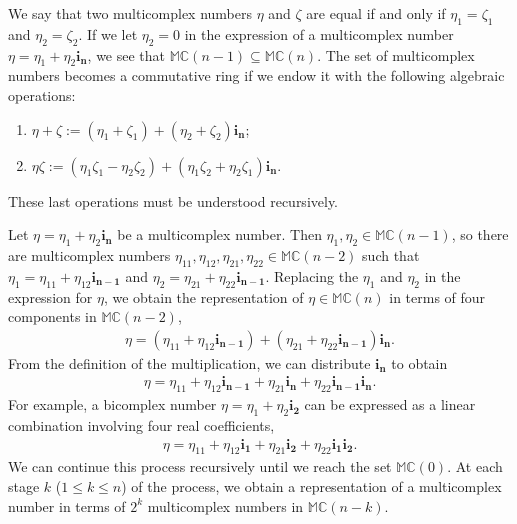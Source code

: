 \documentclass[12pt]{amsart}
\theoremstyle{plain}
\theoremstyle{definition}
\numberwithin{equation}{section}
\newcommand{\im}[1]{\mathbf{ i_{#1}}}
\newcommand{\mC}{\mathbb{C}}
\newcommand{\mM}{\mathbb{M}}
\begin{document}
We say that two multicomplex numbers $\eta$ and $\zeta$ are equal if and only if $\eta_1 = \zeta_1$ and $\eta_2 = \zeta_2$. If we let $\eta_2 = 0$ in the expression of a multicomplex number $\eta = \eta_1 + \eta_2 \im{n}$, we see that $\mM \mC(n - 1) \subseteq \mM \mC(n )$. The set of multicomplex numbers becomes a commutative ring if we endow it with the following algebraic operations:
    \begin{enumerate}[label=\arabic*)]
    \item $\eta + \zeta := (\eta_1 + \zeta_1 ) + (\eta_2 + \zeta_2) \im{n}$;
    \item $\eta \zeta := (\eta_1 \zeta_1 - \eta_2 \zeta_2) + (\eta_1 \zeta_2 + \eta_2 \zeta_1) \im{n}$.
    \end{enumerate}
    These last operations must be understood recursively.
    
    Let $\eta = \eta_1 + \eta_2 \im{n}$ be a multicomplex number. 
  Then $\eta_1 , \eta_2 \in \mM \mC(n - 1)$, so there are multicomplex numbers $\eta_{11}, \eta_{12}, \eta_{21}, \eta_{22}  \in \mM \mC(n - 2 )$ 
 such that $\eta_1 = \eta_{11} + \eta_{12} \im{n-1}$ and $\eta_2 = \eta_{21} + \eta_{22} \im{n-1}$. Replacing the $\eta_1$ and $\eta_2$ in the expression for $\eta$, we obtain the representation of $\eta\in\mM \mC(n)$ in terms of four components in $\mM \mC(n - 2)$,
        \begin{align*}
        \eta=(\eta_{11} + \eta_{12} \im{n - 1} ) + (\eta_{21} + \eta_{22} \im{n - 1}) \im{n}.
        \end{align*}
    From the definition of the multiplication, we can distribute $\im{n}$ to obtain
        \begin{align*}
        \eta=\eta_{11} + \eta_{12} \im{n-1} + \eta_{21} \im{n} + \eta_{22} \im{n-1} \im{n}.
        \end{align*}
    For example, a bicomplex number $\eta = \eta_1 + \eta_2 \im{2}$ can be expressed as a linear combination involving four real coefficients,
        \begin{align*}
        \eta = \eta_{11} + \eta_{12} \im{1} + \eta_{21} \im{2} + \eta_{22} \im{1}\im{2}.
        \end{align*}
    We can continue this process recursively until we reach the set $\mM \mC(0)$. At each stage $k$ ($1 \leq k \leq n$) of the process, we obtain a representation of a multicomplex number in terms of $2^{k}$ multicomplex numbers in $\mM \mC(n - k)$.  
    
\end{document}
